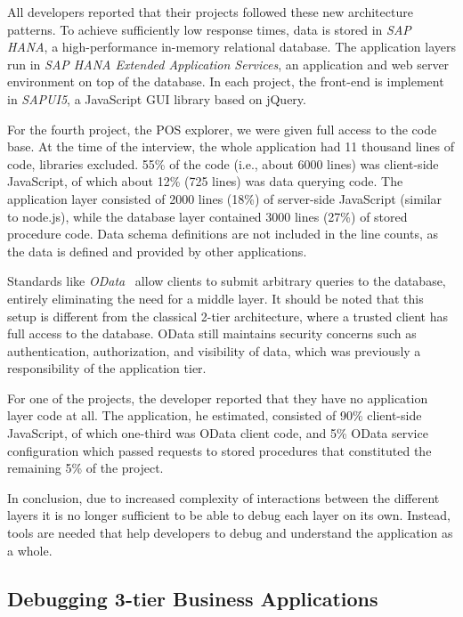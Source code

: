 All developers reported that their projects followed these new architecture patterns.
To achieve sufficiently low response times, data is stored in \emph{SAP HANA}, a high-performance in-memory relational database.
The application layers run in \emph{SAP HANA Extended Application Services}, an application and web server environment on top of the database.
In each project, the front-end is implement in \emph{SAPUI5}, a JavaScript GUI library based on jQuery.

For the fourth project, the POS explorer, we were given full access to the code base.
At the time of the interview, the whole application had 11 thousand lines of code, libraries excluded.
55\% of the code (i.e., about 6000 lines) was client-side JavaScript, of which about 12\% (725 lines) was data querying code.
The application layer consisted of 2000 lines (18\%) of server-side JavaScript (similar to node.js), while the database layer contained 3000 lines (27\%) of stored procedure code.
Data schema definitions are not included in the line counts, as the data is defined and provided by other applications.

Standards like \emph{OData}~\cite{chappell11:introducing_odata} allow clients to submit arbitrary queries to the database, entirely eliminating the need for a middle layer.
It should be noted that this setup is different from the classical 2-tier architecture, where a trusted client has full access to the database.
OData still maintains security concerns such as authentication, authorization, and visibility of data, which was previously a responsibility of the application tier.

For one of the projects, the developer reported that they have no application layer code at all.
The application, he estimated, consisted of 90\% client-side JavaScript, of which one-third was OData client code, and 5\% OData service configuration which passed requests to stored procedures that constituted the remaining 5\% of the project.

In conclusion, due to increased complexity of interactions between the different layers it is no longer sufficient to be able to debug each layer on its own.
Instead, tools are needed that help developers to debug and understand the application as a whole.

\subsection{Debugging 3-tier Business Applications}

